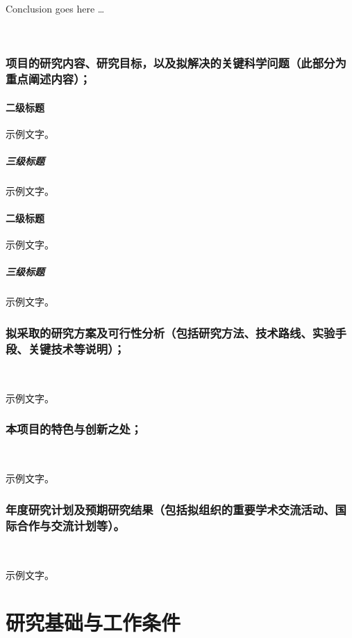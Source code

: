 \documentclass[12pt,a4paper]{article}
\begin{document}
Conclusion goes here \dots

\

\printbibliography[heading=bibliography,title=参考文献]
\clearpage  %

\section{\textbf{项目的研究内容、研究目标，以及拟解决的关键科学问题}（此部分为重点阐述内容）；}
\subsection{二级标题}
示例文字。

\subsubsection{三级标题}
示例文字。

\subsection{二级标题}
示例文字。

\subsubsection{三级标题}
示例文字。


\section{\textbf{拟采取的研究方案及可行性分析}（包括研究方法、技术路线、实验手段、关键技术等说明）；}\

示例文字。

\section{\textbf{本项目的特色与创新之处；}}\

示例文字。
\section{\textbf{年度研究计划及预期研究结果}（包括拟组织的重要学术交流活动、国际合作与交流计划等）。}\

示例文字。

\part{\textbf{研究基础与工作条件}}
\end{document}
